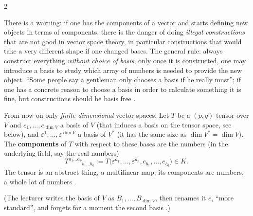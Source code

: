 \begin{paracol}{2}
\begin{intuition}\label{int:te-basisfree}
There is a warning: if one has the components of a vector and starts defining new objects in terms of components, there is the danger of doing \emph{illegal constructions} that are not good in vector space theory, in particular constructions that would take a very different shape if one changed bases. The general rule: always construct
everything \emph{without choice of basis}; only once it is constructed, one may introduce a basis to study which array of numbers is needed to provide the new object. ``Some people say a gentleman only chooses a basis if he really must''; if one has a concrete reason to choose a basis in order to calculate something it is fine,
but constructions should be basis free .
\end{intuition}

\begin{definition}\label{def:te-components}
From now on only \emph{finite dimensional} vector spaces. Let $T$ be a $(p,q)$ tensor over $V$ and $e_1,\dots,e_{\dim V}$ a basis of $V$ (that induces a basis on the tensor space, see below), and $\varepsilon^1,\dots,\varepsilon^{\dim V}$ a basis of $V^*$ (it has the same size as $\dim V^*=\dim V$). The \textbf{components} of $T$ with
respect to these bases are the numbers (in the underlying field, say the real numbers)
\[
  T^{a_1\dots a_p}{}_{b_1\dots b_q}:=T\bigl(\varepsilon^{a_1},\dots,\varepsilon^{a_p},e_{b_1},\dots,e_{b_q}\bigr)\in K.
\]
The tensor is an abstract thing, a multilinear map; its components are numbers, a whole lot of numbers .
\end{definition}
(The lecturer writes the basis of $V$ as $B_1,\dots,B_{\dim V}$, then renames it $e$, ``more standard'', and forgets for a moment the second basis .)


\end{paracol}
